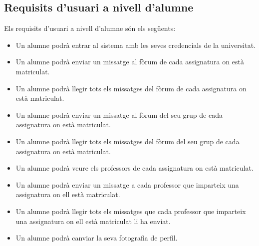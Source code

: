 \subsection{Requisits d'usuari a nivell d'alumne}
Els requisits d'usuari a nivell d'alumne són els següents:
\begin{itemize}
	\item Un alumne podrà entrar al sistema amb les seves credencials de la universitat.
	\item Un alumne podrà enviar un missatge al fòrum de cada assignatura on està matriculat.
	\item Un alumne podrà llegir tots els missatges del fòrum de cada assignatura on està matriculat.
	\item Un alumne podrà enviar un missatge al fòrum del seu grup de cada assignatura on està matriculat.
	\item Un alumne podrà llegir tots els missatges del fòrum del seu grup de cada assignatura on està matriculat.
	\item Un alumne podrà veure els professors de cada assignatura on està matriculat.
	\item Un alumne podrà enviar un missatge a cada professor que imparteix una assignatura on ell està matriculat.
	\item Un alumne podrà llegir tots els missatges que cada professor que imparteix una assignatura on ell està matriculat li ha enviat.
	\item Un alumne podrà canviar la seva fotografia de perfil.
\end{itemize}

